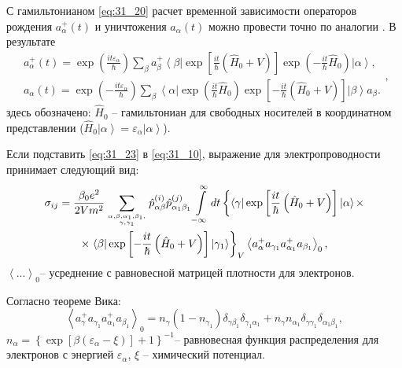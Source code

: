 С гамильтонианом \eqref{eq:31_20} расчет временной зависимости операторов
рождения $a_\alpha ^ + (t)$ и уничтожения $a_\alpha (t)$ можно
провести точно по аналогии \cite{Khamidullin2002}. В результате
\begin{equation}
\begin{array}{c}\label{eq:31_23}
\displaystyle a_\alpha ^ + (t) = \exp\left(
{\frac{it\varepsilon _\alpha }{\hbar }} \right)\sum\limits_\beta
{a_\beta ^ + \left\langle \beta \right|} \exp\left[
{\frac{it}{\hbar }\left( {\hat {H}_0 + V} \right)}
\right]\exp\left( { - \frac{it}{\hbar }\hat {H}_0 }
\right)\left| \alpha \right\rangle ,\\
\displaystyle a_\alpha (t) = \exp\left( { - \frac{it\varepsilon
		_\alpha }{\hbar }} \right)\sum\limits_\beta {\left\langle \alpha
	\right|} \exp\left( {\frac{it}{\hbar }\hat {H}_0 }
\right)\exp\left[ { - \frac{it}{\hbar }\left( {\hat {H}_0 + V}
	\right)} \right]\left| \beta \right\rangle a_\beta .
\end{array},
\end{equation}
здесь обозначено: $\hat {H}_0 $ -- гамильтониан для свободных
носителей в координатном представлении ($\hat {H}_0 \left| \alpha
\right\rangle = \varepsilon _\alpha \left| \alpha \right\rangle
$).

Если подставить \eqref{eq:31_23}  в \eqref{eq:31_10}, выражение для
электропроводности принимает следующий вид:
\begin{multline}
\sigma_{ij}=\frac{\beta_0e^2}{2Vm^2}\sum\limits_{\alpha	,\beta ,\alpha _1 ,\beta _1, \atop \gamma ,\gamma _1 } 
\hat{p}_{\alpha \beta}^{(i)} \hat {p}_{\alpha _1 \beta_1}^{(j)}
\int\limits_{- \infty }^\infty
{dt \left\{ \left\langle \gamma \right|\exp\left[\frac{it}{\hbar}\left(\hat{H}_0 + V\right)\right]\left|\alpha\right\rangle\right.}\times\\
\times\displaystyle\left.\left\langle \beta
\right|\exp\left[-\frac{it}{\hbar}\left(\hat {H}_0 +
V\right)\right]\left|\gamma_1\right\rangle\right\}_V \left\langle
{a_\alpha ^ + a_{\gamma _1 } a_{\alpha _1 }^ + a_{\beta _1 } }
\right\rangle _0,
\end{multline}
$\left\langle
{...} \right\rangle _0 $-- усреднение с равновесной матрицей
плотности для электронов.

Согласно теореме Вика:
\begin{equation}\label{eq:31_26}
\left\langle {a_\gamma ^ + a_{\gamma _1 } a_{\alpha _1
	}^ + a_{\beta _1 } } \right\rangle _0 = n_\gamma \left( {1 -
	n_{\gamma _1 } } \right)\delta _{\gamma \beta _1 } \delta _{\gamma
	_1 \alpha _1 } + n_\gamma n_{\alpha _1 } \delta _{\gamma \gamma _1
} \delta _{\alpha _1 \beta _1 } ,
\end{equation}
$n_\alpha = \left\{ {\exp\left[ {\beta \left( {\varepsilon _\alpha
			- \xi } \right)} \right] + 1} \right\}^{ - 1}$-- равновесная
функция распределения для электронов с энергией $\varepsilon _\alpha$, $\xi $ -- химический
потенциал.

